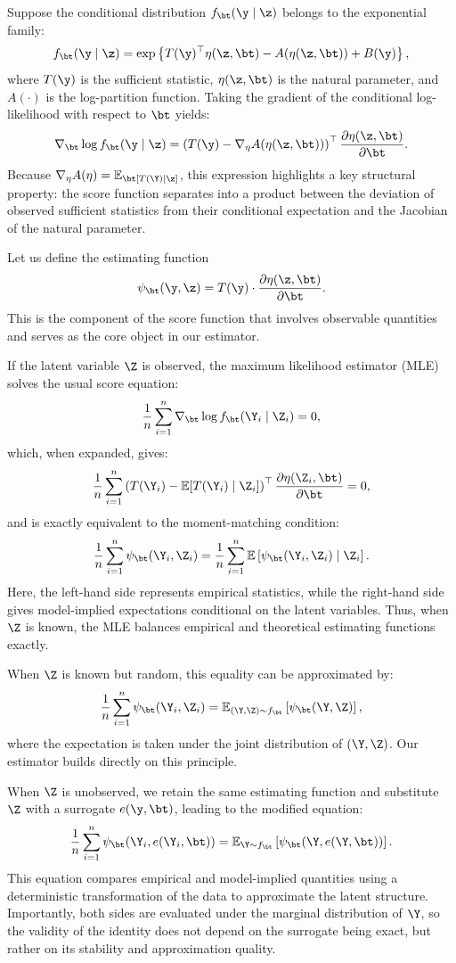Suppose the conditional distribution \( f_\bt(\y \mid \z) \) belongs to the exponential family:
\[
f_\bt(\y \mid \z) = \exp\left\{ T(\y)^\top \eta(\z, \bt) - A(\eta(\z, \bt)) + B(\y) \right\},
\]
where \( T(\y) \) is the sufficient statistic, \( \eta(\z, \bt) \) is the natural parameter, and \( A(\cdot) \) is the log-partition function. Taking the gradient of the conditional log-likelihood with respect to \(\bt\) yields:
\[
\nabla_\bt \log f_\bt(\y \mid \z) = \left( T(\y) - \nabla_\eta A(\eta(\z, \bt)) \right)^\top \frac{\partial \eta(\z, \bt)}{\partial \bt}.
\]
Because \( \nabla_\eta A(\eta) = \mathbb{E}_\bt[T(\Y) \mid \z] \), this expression highlights a key structural property: the score function separates into a product between the deviation of observed sufficient statistics from their conditional expectation and the Jacobian of the natural parameter.

Let us define the estimating function
\[
\psi_\bt(\y, \z) = T(\y) \cdot \frac{\partial \eta(\z, \bt)}{\partial \bt}.
\]
This is the component of the score function that involves observable quantities and serves as the core object in our estimator.

If the latent variable \(\Z\) is observed, the maximum likelihood estimator (MLE) solves the usual score equation:
\[
\frac{1}{n} \sum_{i=1}^n \nabla_\bt \log f_\bt(\Y_i \mid \Z_i) = 0,
\]
which, when expanded, gives:
\[
\frac{1}{n} \sum_{i=1}^n \left( T(\Y_i) - \mathbb{E}[T(\Y_i) \mid \Z_i] \right)^\top \frac{\partial \eta(\Z_i, \bt)}{\partial \bt} = 0,
\]
and is exactly equivalent to the moment-matching condition:
\[
\frac{1}{n} \sum_{i=1}^n \psi_\bt(\Y_i, \Z_i)
=
\frac{1}{n} \sum_{i=1}^n \mathbb{E}\left[ \psi_\bt(\Y_i, \Z_i) \mid \Z_i \right].
\]
Here, the left-hand side represents empirical statistics, while the right-hand side gives model-implied expectations conditional on the latent variables. Thus, when \(\Z\) is known, the MLE balances empirical and theoretical estimating functions exactly.

When \(\Z\) is known but random, this equality can be approximated by:
\[
\frac{1}{n} \sum_{i=1}^n \psi_\bt(\Y_i, \Z_i)
= \mathbb{E}_{(\Y, \Z) \sim f_\bt}\left[ \psi_\bt(\Y, \Z) \right],
\]
where the expectation is taken under the joint distribution of \((\Y, \Z)\). Our estimator builds directly on this principle.

When \(\Z\) is unobserved, we retain the same estimating function and substitute \(\Z\) with a surrogate \( e(\y, \bt) \), leading to the modified equation:
\[
\frac{1}{n} \sum_{i=1}^n \psi_\bt(\Y_i, e(\Y_i, \bt)) 
=
\mathbb{E}_{\Y \sim f_\bt} \left[ \psi_\bt(\Y, e(\Y, \bt)) \right].
\]
This equation compares empirical and model-implied quantities using a deterministic transformation of the data to approximate the latent structure. Importantly, both sides are evaluated under the marginal distribution of \(\Y\), so the validity of the identity does not depend on the surrogate being exact, but rather on its stability and approximation quality.

